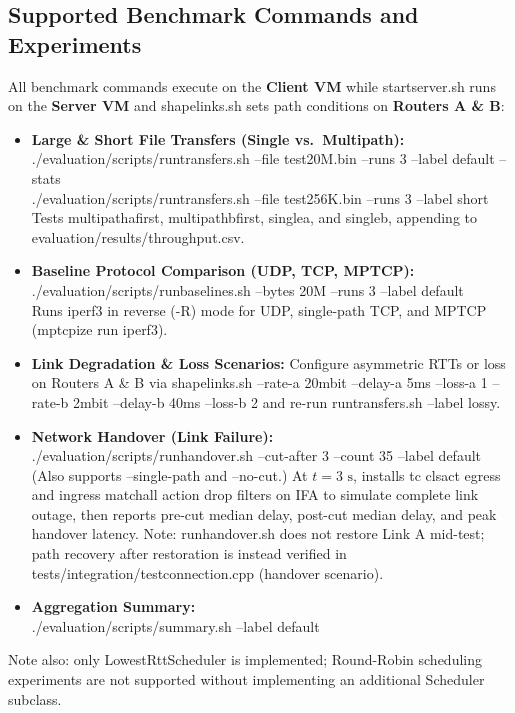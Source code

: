 \documentclass[10pt,a4paper]{article}
\newcommand{\codeul}{\textunderscore\hspace{0pt}}
\DeclareRobustCommand{\code}[1]{{\ttfamily\let\_\codeul #1}}
\begin{document}
\subsection{Supported Benchmark Commands and Experiments}
All benchmark commands execute on the \textbf{Client VM} while \code{start\_server.sh} runs on the \textbf{Server VM} and \code{shape\_links.sh} sets path conditions on \textbf{Routers A \& B}:
\begin{itemize}
    \item \textbf{Large \& Short File Transfers (Single vs.\ Multipath):}\\
    \code{./evaluation/scripts/run\_transfers.sh --file test20M.bin --runs 3 --label default --stats}\\
    \code{./evaluation/scripts/run\_transfers.sh --file test256K.bin --runs 3 --label short}\\
    Tests \code{multipath\_a\_first}, \code{multipath\_b\_first}, \code{single\_a}, and \code{single\_b}, appending to \code{evaluation/\hspace{0pt}results/\hspace{0pt}throughput.csv}.
    \item \textbf{Baseline Protocol Comparison (UDP, TCP, MPTCP):}\\
    \code{./evaluation/scripts/run\_baselines.sh --bytes 20M --runs 3 --label default}\\
    Runs \code{iperf3} in reverse (\code{-R}) mode for UDP, single-path TCP, and MPTCP (\code{mptcpize run iperf3}).
    \item \textbf{Link Degradation \& Loss Scenarios:} Configure asymmetric RTTs or loss on Routers A \& B via \code{shape\_links.sh --rate-a 20mbit --delay-a 5ms --loss-a 1 --rate-b 2mbit --delay-b 40ms --loss-b 2} and re-run \code{run\_transfers.sh --label lossy}.
    \item \textbf{Network Handover (Link Failure):}\\
    \code{./evaluation/scripts/run\_handover.sh --cut-after 3 --count 35 --label default}\\
    (Also supports \code{--single-path} and \code{--no-cut}.) At $t = 3\text{ s}$, installs \code{tc clsact} egress and ingress \code{matchall action drop} filters on \code{IF\_A} to simulate complete link outage, then reports pre-cut median delay, post-cut median delay, and peak handover latency. Note: \code{run\_handover.sh} does not restore Link A mid-test; path recovery after restoration is instead verified in \code{tests/integration/test\_connection.cpp} (\code{handover} scenario).
    \item \textbf{Aggregation Summary:}\\
    \code{./evaluation/scripts/summary.sh --label default}
\end{itemize}
Note also: only \code{LowestRttScheduler} is implemented; Round-Robin scheduling experiments are not supported without implementing an additional \code{Scheduler} subclass.
\end{document}
